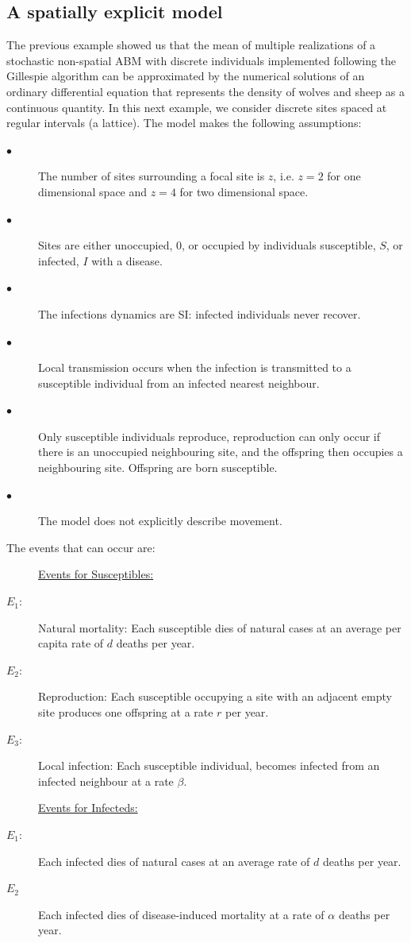 \documentclass[11pt, oneside]{article}   	%
\begin{document}
\subsection{A spatially explicit model}
The previous example showed us that the mean of multiple realizations of a stochastic non-spatial ABM with discrete individuals implemented following the Gillespie algorithm can be approximated by the numerical solutions of an ordinary differential equation that represents the density of wolves and sheep as a continuous quantity. In this next example, we consider discrete sites spaced at regular intervals (a lattice). The model makes the following assumptions:

\begin{description} 
\item[$\bullet$] The number of sites surrounding a focal site is $z$, i.e. $z=2$ for one dimensional space and $z=4$ for two dimensional space.
\item[$\bullet$] Sites are either unoccupied, $0$, or occupied by individuals susceptible, $S$, or infected, $I$ with a disease.
\item[$\bullet$] The infections dynamics are SI: infected individuals never recover.
\item[$\bullet$] Local transmission occurs when the infection is transmitted to a susceptible individual from an infected nearest neighbour.
\item[$\bullet$] Only susceptible individuals reproduce, reproduction can only occur if there is an unoccupied neighbouring site, and the offspring then occupies a neighbouring site. Offspring are born susceptible.
\item[$\bullet$] The model does not explicitly describe movement.
\end{description}

The events that can occur are:
\begin{description} 
\item[] \underline{Events for Susceptibles:}
\item[$E_1:$] Natural mortality: Each susceptible dies of natural cases at an average per capita rate of $d$ deaths per year. 
\item[$E_2:$] Reproduction: Each susceptible occupying a site with an adjacent empty site produces one offspring at a rate $r$ per year.
\item[$E_3:$] Local infection: Each susceptible individual, becomes infected from an infected neighbour at a rate $\beta$.
\item[] \underline{Events for Infecteds:}
\item[$E_1:$] Each infected dies of natural cases at an average rate of $d$ deaths per year. 
\item[$E_2$] Each infected dies of disease-induced mortality at a rate of $\alpha$ deaths per year.
\end{description}
\end{document}
